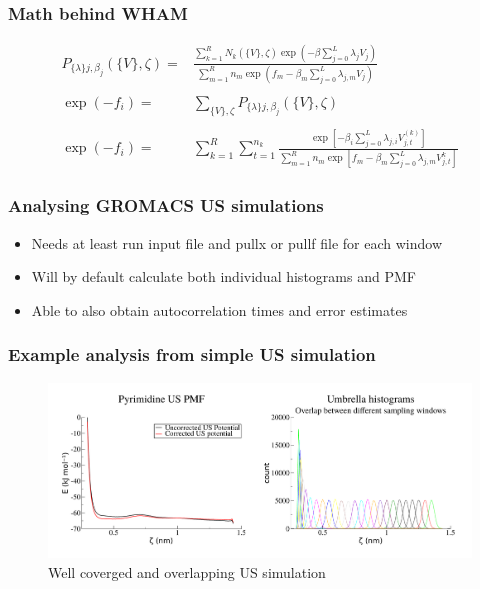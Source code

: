 \documentclass{beamer}
\numberwithin{table}{section}
\numberwithin{figure}{section}
\numberwithin{equation}{section}
\begin{document}
\begin{frame}
\frametitle{Math behind WHAM}

    \begin{eqnarray*}
        P_{\{\lambda\}j,{\beta}_{j}} \left(\{V\}, \zeta \right) =&
        \frac{\sum_{k=1}^{R} N_{k}\left( \{V\}, \zeta\right) \exp{ \left(-{\beta}\sum_{j=0}^{L} {\lambda}_{j}V_{j} \right)}}{\sum_{m=1}^{R} n_{m} \exp{ \left( f_{m} -{\beta}_{m} \sum_{j=0}^{L} {\lambda}_{j,m} V_{j} \right)}} \\\\
        \exp{\left(-f_{i}\right)} =& \sum_{\{V\}, \zeta} P_{\{\lambda\}j,{\beta}_{j}} \left(\{V\}, \zeta \right) \\\\
        \exp{\left(-f_{i}\right)} =& 
        \sum_{k=1}^{R} \sum_{t=1}^{n_{k}} \frac{\exp{\left[ -{\beta}_{i} \sum_{j=0}^{L} {\lambda}_{j,i} V_{j,t}^{(k)}\right]}}{\sum_{m=1}^{R} n_{m} \exp{\left[ f_{m} -{\beta}_{m} \sum_{j=0}^{L} {\lambda}_{j,m} V_{j,t}^{k} \right]}}
    \end{eqnarray*}
\end{frame}

\begin{frame}
\frametitle{Analysing GROMACS US simulations}
    \begin{itemize}
        \item{Needs at least run input file and pullx or pullf file for each window}
        \item{Will by default calculate both individual histograms and PMF}
        \item{Able to also obtain autocorrelation times and error estimates}
    \end{itemize}
\end{frame}

\begin{frame}
\frametitle{Example analysis from simple US simulation}
    \begin{figure}[htb]
        \centering
        \includegraphics[keepaspectratio=true, width=\textwidth]{figures/histoprofile.pdf}
        \caption{Well coverged and overlapping US simulation}
    \end{figure}
\end{frame}
\end{document}
